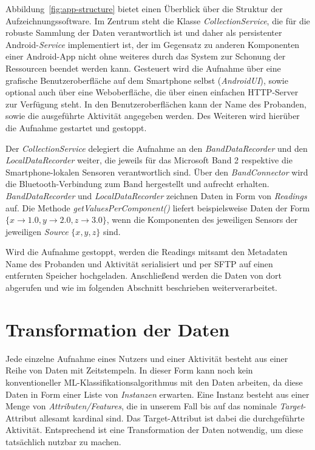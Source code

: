 Abbildung~\ref{fig:app-structure} bietet einen Überblick über die Struktur der Aufzeichnungssoftware. Im Zentrum steht die Klasse \textit{CollectionService}, die für die robuste Sammlung der Daten verantwortlich ist und daher als persistenter Android-\textit{Service} implementiert ist, der im Gegensatz zu anderen Komponenten einer Android-App nicht ohne weiteres durch das System zur Schonung der Ressourcen beendet werden kann. Gesteuert wird die Aufnahme über eine grafische Benutzeroberfläche auf dem Smartphone selbst (\textit{AndroidUI}), sowie optional auch über eine Weboberfläche, die über einen einfachen HTTP-Server zur Verfügung steht. In den Benutzeroberflächen kann der Name des Probanden, sowie die ausgeführte Aktivität angegeben werden. Des Weiteren wird hierüber die Aufnahme gestartet und gestoppt.

Der \textit{CollectionService} delegiert die Aufnahme an den \textit{BandDataRecorder} und den \textit{LocalDataRecorder} weiter, die jeweils für das Microsoft Band 2 respektive die Smartphone-lokalen Sensoren verantwortlich sind. Über den \textit{BandConnector} wird die Bluetooth-Verbindung zum Band hergestellt und aufrecht erhalten. \textit{BandDataRecorder} und \textit{LocalDataRecorder} zeichnen Daten in Form von \textit{Readings} auf. Die Methode \textit{getValuesPerComponent()} liefert beispielsweise Daten der Form $\{x \to 1.0, y \to 2.0, z \to 3.0\}$, wenn die Komponenten des jeweiligen Sensors der jeweiligen \textit{Source} $\{x, y, z\}$ sind.

Wird die Aufnahme gestoppt, werden die Readings mitsamt den Metadaten Name des Probanden und Aktivität serialisiert und per SFTP auf einen entfernten Speicher hochgeladen. Anschließend werden die Daten von dort abgerufen und wie im folgenden Abschnitt beschrieben weiterverarbeitet.

\section{Transformation der Daten}
Jede einzelne Aufnahme eines Nutzers und einer Aktivität besteht aus einer Reihe von Daten mit Zeitstempeln. In dieser Form kann noch kein konventioneller ML-Klassifikationsalgorithmus mit den Daten arbeiten, da diese Daten in Form einer Liste von \textit{Instanzen} erwarten. Eine Instanz besteht aus einer Menge von \textit{Attributen/Features}, die in unserem Fall bis auf das nominale \textit{Target}-Attribut allesamt kardinal sind. Das Target-Attribut ist dabei die durchgeführte Aktivität. Entsprechend ist eine Transformation der Daten notwendig, um diese tatsächlich nutzbar zu machen.

